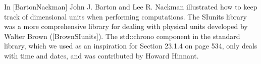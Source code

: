 In [BartonNackman] John J. Barton and Lee R. Nackman illustrated how to keep track of dimensional units when performing computations. The SIunits library was a more comprehensive library for dealing with physical units developed by Walter Brown ([BrownSIunits]). The std::chrono component in the standard library, which we used as an inspiration for Section 23.1.4 on page 534, only deals with time and dates, and was contributed by Howard Hinnant.































